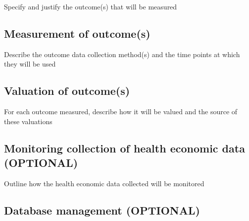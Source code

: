 Specify and justify the outcome(s) that will be measured



\subsection{Measurement of outcome(s)}

Describe the outcome data collection method(s) and the time points at
which they will be used


\subsection{Valuation of outcome(s)}

For each outcome measured, describe how it will be valued and the source of these valuations


\subsection{Monitoring collection of health economic data (OPTIONAL)}

Outline how the health economic data collected will be monitored



\subsection{Database management (OPTIONAL)}

